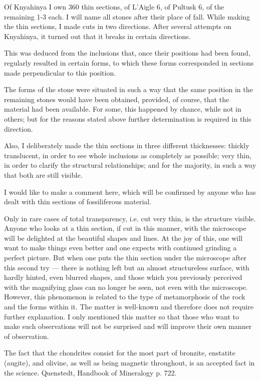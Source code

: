 \documentclass[a4paper, 12pt, oneside]{article}
\begin{document}
Of Knyahinya I own 360 thin sections, of L'Aigle 6, of Pultusk 6, of the remaining 1-3 each. I will name all stones after their place of fall. While making the thin sections, I made cuts in two directions. After several attempts on Knyahinya, it turned out that it breaks in certain directions.

This was deduced from the inclusions that, once their positions had been found, regularly resulted in certain forms, to which these forms corresponded in sections made perpendicular to this position.

The forms of the stone were situated in such a way that the same position in the remaining stones would have been obtained, provided, of course, that the material had been available. For some, this happened by chance, while not in others; but for the reasons stated above further determination is required in this direction.

Also, I deliberately made the thin sections in three different thicknesses: thickly translucent, in order to see whole inclusions as completely as possible; very thin, in order to clarify the structural relationships; and for the majority, in such a way that both are still visible.

I would like to make a comment here, which will be confirmed by anyone who has dealt with thin sections of fossiliferous material.

Only in rare cases of total transparency, i.e. cut very thin, is the structure visible. Anyone who looks at a thin section, if cut in this manner, with the microscope will be delighted at the beautiful shapes and lines. At the joy of this, one will want to make things even better and one expects with continued grinding a perfect picture. But when one puts the thin section under the microscope after this second try — there is nothing left but an almost structureless surface, with hardly hinted, even blurred shapes, and those which you previously perceived with the magnifying glass can no longer be seen, not even with the microscope. However, this phenomenon is related to the type of metamorphosis of the rock and the forms within it. The matter is well-known and therefore does not require further explanation. I only mentioned this matter so that those who want to make such observations will not be surprised and will improve their own manner of observation.

The fact that the chondrites consist for the most part of bronzite, enstatite (augite), and olivine, as well as being magnetic throughout, is an accepted fact in the science. Quenstedt, Handbook of Mineralogy p. 722.
\end{document}
